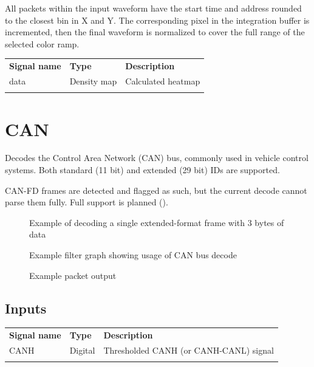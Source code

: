 All packets within the input waveform have the start time and address rounded to the closest bin in X and Y. The
corresponding pixel in the integration buffer is incremented, then the final waveform is normalized to cover the full
range of the selected color ramp.

\begin{tabularx}{16cm}{llX}
\thickhline
\textbf{Signal name} & \textbf{Type} & \textbf{Description} \\
\thickhline
data & Density map & Calculated heatmap \\
\thickhline
\end{tabularx}

\pagebreak
\section{CAN}
\label{filter:can}

Decodes the Control Area Network (CAN) bus, commonly used in vehicle control systems. Both standard (11 bit) and
extended (29 bit) IDs are supported.

CAN-FD frames are detected and flagged as such, but the current decode cannot parse them fully. Full support is planned
().

\begin{figure}[h]
\centering
{}
\caption{Example of decoding a single extended-format frame with 3 bytes of data}
\label{filter_can}
\end{figure}

\begin{figure}[h]
\centering
{}
\caption{Example filter graph showing usage of CAN bus decode}
\label{filter_graph_can}
\end{figure}

\begin{figure}[h]
\centering
{}
\caption{Example packet output}
\label{packet_can}
\end{figure}

\FloatBarrier

\subsection{Inputs}

\begin{tabularx}{16cm}{llX}
\thickhline
\textbf{Signal name} & \textbf{Type} & \textbf{Description} \\
\thickhline
CANH & Digital & Thresholded CANH (or CANH-CANL) signal \\
\thickhline
\end{tabularx}

